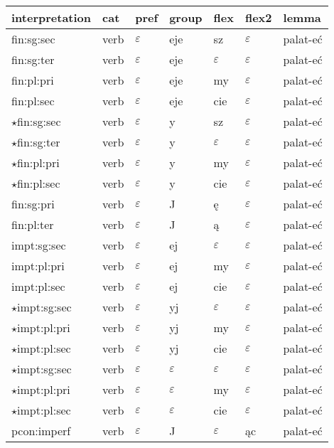 \documentclass{article}
\begin{document}
\begin{longtable}{p{7cm}|l|l|l|l|l|l}
interpretation & cat & pref & group & flex & flex2 & lemma\\
\hline
fin:sg:sec & verb & $\varepsilon$ & eje & sz & $\varepsilon$ & palat-eć\\
fin:sg:ter & verb & $\varepsilon$ & eje & $\varepsilon$ & $\varepsilon$ & palat-eć\\
fin:pl:pri & verb & $\varepsilon$ & eje & my & $\varepsilon$ & palat-eć\\
fin:pl:sec & verb & $\varepsilon$ & eje & cie & $\varepsilon$ & palat-eć\\
$\star$fin:sg:sec & verb & $\varepsilon$ & y & sz & $\varepsilon$ & palat-eć\\
$\star$fin:sg:ter & verb & $\varepsilon$ & y & $\varepsilon$ & $\varepsilon$ & palat-eć\\
$\star$fin:pl:pri & verb & $\varepsilon$ & y & my & $\varepsilon$ & palat-eć\\
$\star$fin:pl:sec & verb & $\varepsilon$ & y & cie & $\varepsilon$ & palat-eć\\
fin:sg:pri & verb & $\varepsilon$ & J & ę & $\varepsilon$ & palat-eć\\
fin:pl:ter & verb & $\varepsilon$ & J & ą & $\varepsilon$ & palat-eć\\
impt:sg:sec & verb & $\varepsilon$ & ej & $\varepsilon$ & $\varepsilon$ & palat-eć\\
impt:pl:pri & verb & $\varepsilon$ & ej & my & $\varepsilon$ & palat-eć\\
impt:pl:sec & verb & $\varepsilon$ & ej & cie & $\varepsilon$ & palat-eć\\
$\star$impt:sg:sec & verb & $\varepsilon$ & yj & $\varepsilon$ & $\varepsilon$ & palat-eć\\
$\star$impt:pl:pri & verb & $\varepsilon$ & yj & my & $\varepsilon$ & palat-eć\\
$\star$impt:pl:sec & verb & $\varepsilon$ & yj & cie & $\varepsilon$ & palat-eć\\
$\star$impt:sg:sec & verb & $\varepsilon$ & $\varepsilon$ & $\varepsilon$ & $\varepsilon$ & palat-eć\\
$\star$impt:pl:pri & verb & $\varepsilon$ & $\varepsilon$ & my & $\varepsilon$ & palat-eć\\
$\star$impt:pl:sec & verb & $\varepsilon$ & $\varepsilon$ & cie & $\varepsilon$ & palat-eć\\
pcon:imperf & verb & $\varepsilon$ & J & $\varepsilon$ & ąc & palat-eć\\

\end{longtable}
\end{document}
